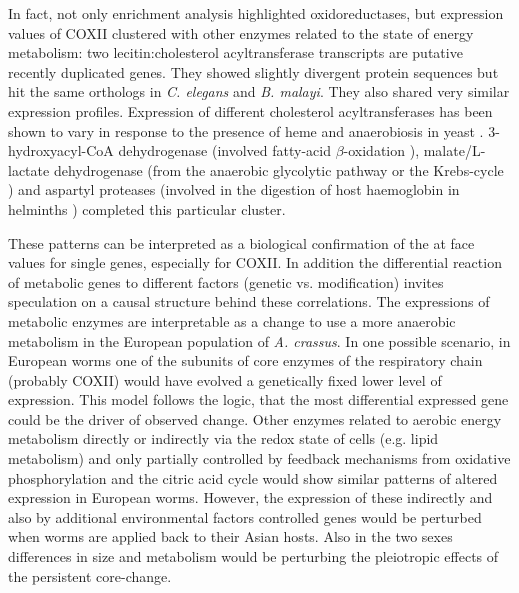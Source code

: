 In fact, not only enrichment analysis highlighted oxidoreductases, but
expression values of COXII clustered with other enzymes related to the
state of energy metabolism: two lecitin:cholesterol acyltransferase
transcripts are putative recently duplicated genes. They showed
slightly divergent protein sequences but hit the same orthologs in
\textit{C. elegans} and \textit{B. malayi}. They also shared very
similar expression profiles. Expression of different cholesterol
acyltransferases has been shown to vary in response to the presence of
heme and anaerobiosis in yeast \cite{pmid11786267}. 3-hydroxyacyl-CoA
dehydrogenase (involved fatty-acid $\beta$-oxidation
\cite{pmid8454629}), malate/L-lactate dehydrogenase (from the
anaerobic glycolytic pathway or the Krebs-cycle
\cite{sturm1969vergleichende}) and aspartyl proteases (involved in the
digestion of host haemoglobin in helminths \cite{pmid12782060})
completed this particular cluster.

These patterns can be interpreted as a biological confirmation of the
at face values for single genes, especially for COXII. In addition the
differential reaction of metabolic genes to different factors (genetic
vs. modification) invites speculation on a causal structure behind
these correlations. The expressions of metabolic enzymes are
interpretable as a change to use a more anaerobic metabolism in the
European population of \textit{A. crassus}. In one possible scenario,
in European worms one of the subunits of core enzymes of the
respiratory chain (probably COXII) would have evolved a genetically
fixed lower level of expression. This model follows the logic, that
the most differential expressed gene could be the driver of observed
change. Other enzymes related to aerobic energy metabolism directly or
indirectly via the redox state of cells (e.g. lipid metabolism) and
only partially controlled by feedback mechanisms from oxidative
phosphorylation and the citric acid cycle would show similar patterns
of altered expression in European worms. However, the expression of
these indirectly and also by additional environmental factors
controlled genes would be perturbed when worms are applied back to
their Asian hosts. Also in the two sexes differences in size and
metabolism would be perturbing the pleiotropic effects of the
persistent core-change.


